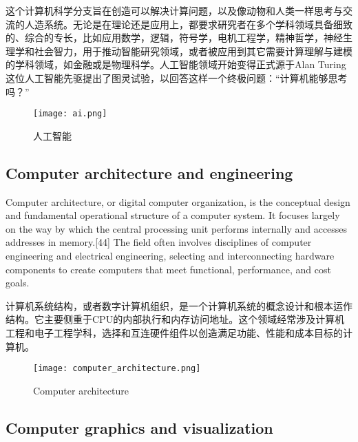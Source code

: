 这个计算机科学分支旨在创造可以解决计算问题，以及像动物和人类一样思考与交流的人造系统。无论是在理论还是应用上，都要求研究者在多个学科领域具备细致的、综合的专长，比如应用数学，逻辑，符号学，电机工程学，精神哲学，神经生理学和社会智力，用于推动智能研究领域，或者被应用到其它需要计算理解与建模的学科领域，如金融或是物理科学。人工智能领域开始变得正式源于Alan Turing这位人工智能先驱提出了图灵试验，以回答这样一个终极问题：“计算机能够思考吗？”

\begin{figure}[!h]
\centering
\texttt{[image: ai.png]}
\caption{人工智能}
\label{ai}
\end{figure}













\subsection{Computer architecture and engineering}




Computer architecture, or digital computer organization, is the conceptual design and fundamental operational structure of a computer system. It focuses largely on the way by which the central processing unit performs internally and accesses addresses in memory.[44] The field often involves disciplines of computer engineering and electrical engineering, selecting and interconnecting hardware components to create computers that meet functional, performance, and cost goals.

计算机系统结构，或者数字计算机组织，是一个计算机系统的概念设计和根本运作结构。它主要侧重于CPU的内部执行和内存访问地址。这个领域经常涉及计算机工程和电子工程学科，选择和互连硬件组件以创造满足功能、性能和成本目标的计算机。


\begin{figure}[!h]
\centering
\texttt{[image: computer\_architecture.png]}
\caption{Computer architecture}
\label{computer_architecture}
\end{figure}













\subsection{Computer graphics and visualization}



